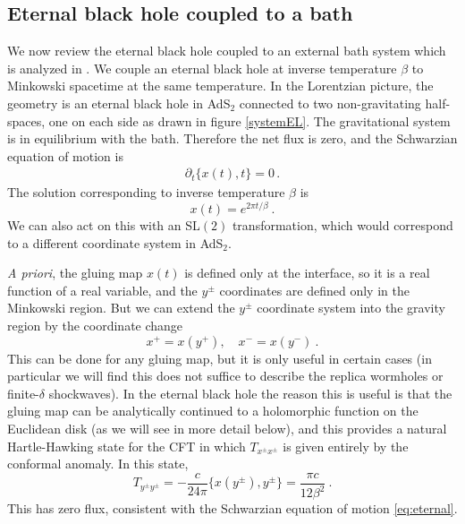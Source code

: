 \documentclass[12pt]{article}
\newcommand{\p}{\partial}
\newcommand{\be}{\begin{equation}}
\newcommand{\ee}{\end{equation}}
\def\be{\begin{eqnarray}}
\def\ee{\end{eqnarray}}
\def\be{\begin{equation}}
\def\ee{\end{equation}}
\def\ba{\begin{eqnarray}}
\def\ea{\end{eqnarray}}
\renewcommand{\p}{\partial}
\numberwithin{equation}{section}
\def\p{{\phi}}
\def\be{\begin{equation}}
\def\ee{\end{equation}}
\def\ba{\begin{eqnarray}}
\def\ea{\end{eqnarray}}
\def \be {\begin{equation}}
\def \ee {\end{equation}}
\renewcommand{\p}{\partial}
\begin{document}
\begin{spacing}{1.1}
\subsection{Eternal black hole coupled to a bath}
We now review the eternal black hole coupled to an external bath system which is analyzed in \cite{Almheiri:2019psf}. We couple an eternal black hole at inverse temperature $\beta$ to Minkowski spacetime at the same temperature. In the Lorentzian picture, the geometry  is an eternal black hole in AdS$_2$ connected to two non-gravitating half-spaces, one on each side as drawn in figure \ref{systemEL}. The gravitational system is in equilibrium with the bath. Therefore the net flux is zero, and the Schwarzian equation of motion is
\ba\label{eq:eternal}
\p_t \{x(t),t\} =0\, .
\ea
The solution corresponding to inverse temperature $\beta$ is
\be\label{solueternal}
x(t) = e^{2\pi t / \beta} \ .
\ee
We can also act on this with an SL$(2)$ transformation, which would correspond to a different coordinate system in AdS$_2$.

\textit{A priori}, the gluing map $x(t)$ is defined only at the interface, so it is a real function of a real variable, and the $y^\pm$ coordinates are defined only in the Minkowski region. But we can extend the $y^{\pm}$ coordinate system  into the gravity region by the coordinate change
\be\label{xyrel}
x^+ = x(y^+) , \quad x^- = x(y^-) \ .
\ee
This can be done for any gluing map, but it is only useful in certain cases (in particular we will find this does not suffice to describe the replica wormholes or finite-$\delta$ shockwaves). In the eternal black hole the reason this is useful is that the gluing map can be analytically continued to a holomorphic function on the Euclidean disk (as we will see in more detail below), and this provides a natural Hartle-Hawking state for the CFT in which $T_{x^\pm x^\pm}$ is given entirely by the conformal anomaly. In this state, 
\be\label{stress_eternal}
T_{y^\pm y^\pm} = - \frac{c}{24\pi}\{ x(y^\pm), y^\pm \} = \frac{\pi c}{12\beta^2} \ .
\ee
This has zero flux, consistent with the Schwarzian equation of motion  \eqref{eq:eternal}.


\end{spacing}
\end{document}
